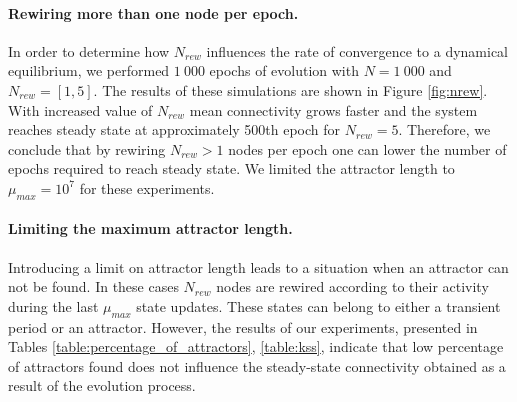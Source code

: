 \documentclass[procedia]{easychair}
\begin{document}
	\paragraph{Rewiring more than one node per epoch.} In order to determine how $N_{rew}$ influences the rate of convergence to a dynamical equilibrium, we performed $1~000$ epochs of evolution with $N=1~000$ and $N_{rew}=[1, 5]$. The results of these simulations are shown in Figure \ref{fig:nrew}. With increased value of $N_{rew}$ mean connectivity grows faster and the system reaches steady state at approximately 500th epoch for $N_{rew}=5$. Therefore, we conclude that by rewiring $N_{rew} > 1$ nodes per epoch one can lower the number of epochs required to reach steady state. We limited the attractor length to $\mu_{max}=10^7$ for these experiments.
	
	\paragraph{Limiting the maximum attractor length.} Introducing a limit on attractor length leads to a situation when an attractor can not be found. In these cases $N_{rew}$ nodes are rewired according to their activity during the last $\mu_{max}$ state updates. These states can belong to either a transient period or an attractor. However, the results of our experiments, presented in Tables \ref{table:percentage_of_attractors}, \ref{table:kss}, indicate that low percentage of attractors found does not influence the steady-state connectivity obtained as a result of the evolution process.
	
\end{document}
